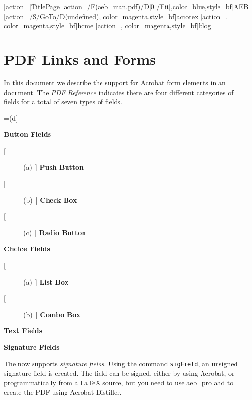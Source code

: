 \documentclass{article}
\makeatletter
\let\bslash\@backslashchar
\let\app\textsf
\def\cs#1{\texttt{\bslash#1}}
\makeatother
\begin{document}
\maketitle

[action={}]{TitlePage}
[action={\GoToR/F(aeb_man.pdf)/D[0 /Fit]},color=blue,style={bf}]{AEB}
[action={/S/GoTo/D(undefined)},%
  color=magenta,style={bf}]{acrotex}
[action={},%
  color=magenta,style={bf}]{home}
[action={},%
  color=magenta,style={bf}]{blog}


\tableofcontents


\part{PDF Links and Forms}


In \hypertarget{eformsPkg}{this} document we describe the support for \app{Acrobat} form elements
in an {\cAcroT} document. The \textit{PDF Reference} indicates there
are four different categories of fields for a total of seven types
of fields.
\begin{questions}

=\hbox{(d)}
\def\I#1{\makebox[\wd0]{\color{blue}(\hfil#1\hfil)}\ }

    \item \textbf{Button Fields}
        \begin{description}
            \item[\I{a}] \textbf{Push Button}
            \item[\I{b}] \textbf{Check Box}
            \item[\I{c}] \textbf{Radio Button}
        \end{description}
    \item \textbf{Choice Fields}
        \begin{description}
            \item[\I{a}] \textbf{List Box}
            \item[\I{b}] \textbf{Combo Box}
        \end{description}
    \item \textbf{Text Fields}
    \item \textbf{Signature Fields}

\end{questions}
The {\cAcroB} now supports \textit{signature fields}. Using the
command \cs{sigField}, an unsigned signature field is created.
The field can be signed, either by using \app{Acrobat}, or programmatically
from a {\LaTeX} source, but you need to use \textsf{aeb\_pro} and to
create the PDF using \app{Acrobat} Distiller.
\end{document}

